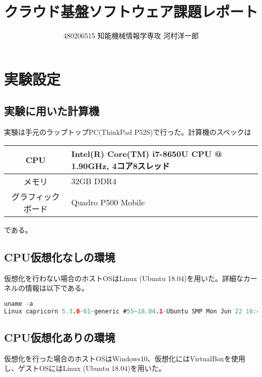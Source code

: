 \documentclass[onecolumn]{preport}
\title{クラウド基盤ソフトウェア課題レポート}
\author{480206515 知能機械情報学専攻 河村洋一郎}
\begin{document}
\pagestyle{empty}
\maketitle
\thispagestyle{empty}
\sloppy

\section{実験設定}
\subsection{実験に用いた計算機}
実験は手元のラップトップPC(ThinkPad P52S)で行った。計算機のスペックは
\begin{table}[htb]
  \begin{tabular}{c|l} \hline
    CPU & Intel(R) Core(TM) i7-8650U CPU @ 1.90GHz, 4コア8スレッド \\ \hline
    メモリ & 32GB DDR4 \\ \hline
    グラフィックボード &  Quadro P500 Mobile \\ \hline
  \end{tabular}
\end{table}
である。
\subsection{CPU仮想化なしの環境}
仮想化を行わない場合のホストOSはLinux (Ubuntu 18.04)を用いた。詳細なカーネルの情報は以下である。
\begin{lstlisting}[language=c]
uname -a
Linux capricorn 5.3.0-61-generic #55~18.04.1-Ubuntu SMP Mon Jun 22 16:40:20 UTC 2020 x86_64 x86_64 x86_64 GNU/Linux
\end{lstlisting}

\subsection{CPU仮想化ありの環境}
仮想化を行った場合のホストOSはWindows10、仮想化にはVirtualBoxを使用し、ゲストOSにはLinux (Ubuntu 18.04)を用いた。
\end{document}
